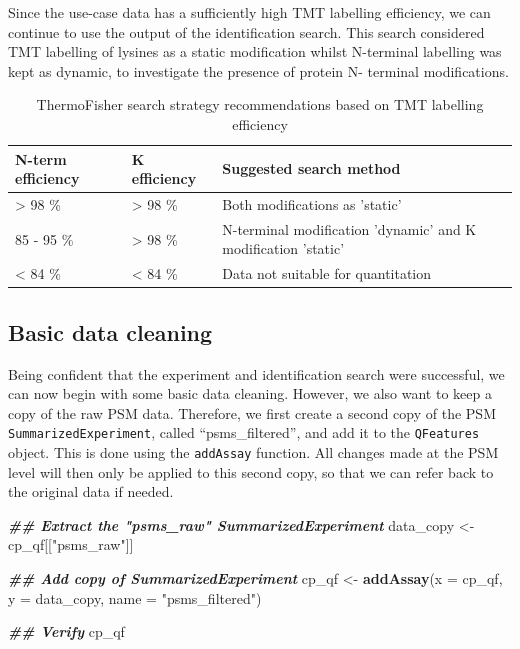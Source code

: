 \documentclass[9pt,a4paper,]{extarticle}
\newenvironment{Shaded}{\begin{snugshade}}{\end{snugshade}}
\newcommand{\AttributeTok}[1]{\textcolor[rgb]{0.13,0.29,0.53}{#1}}
\newcommand{\DocumentationTok}[1]{\textcolor[rgb]{0.56,0.35,0.01}{\textbf{\textit{#1}}}}
\newcommand{\FunctionTok}[1]{\textcolor[rgb]{0.13,0.29,0.53}{\textbf{#1}}}
\newcommand{\NormalTok}[1]{#1}
\newcommand{\OtherTok}[1]{\textcolor[rgb]{0.56,0.35,0.01}{#1}}
\newcommand{\StringTok}[1]{\textcolor[rgb]{0.31,0.60,0.02}{#1}}
\begin{document}
Since the use-case data has a sufficiently high TMT labelling efficiency, we
can continue to use the output of the identification search. This search
considered TMT labelling of lysines as a static modification whilst N-terminal
labelling was kept as dynamic, to investigate the presence of protein N-
terminal modifications.

\begin{table}

\caption{\label{tab:table2}ThermoFisher search strategy recommendations based on TMT labelling efficiency}
\centering
\begin{tabular}[t]{l|l|l}
\hline
N-term efficiency & K efficiency & Suggested search method\\
\hline
> 98 \% & > 98 \% & Both modifications as 'static'\\
\hline
85 - 95 \% & > 98 \% & N-terminal modification 'dynamic' and K modification 'static'\\
\hline
< 84 \% & < 84 \% & Data not suitable for quantitation\\
\hline
\end{tabular}
\end{table}

\subsection{Basic data cleaning}\label{basic-data-cleaning}

Being confident that the experiment and identification search were successful,
we can now begin with some basic data cleaning. However, we also want to keep a
copy of the raw PSM data. Therefore, we first create a second copy of the PSM
\texttt{SummarizedExperiment}, called ``psms\_filtered'', and add it to the \texttt{QFeatures}
object. This is done using the \texttt{addAssay} function. All changes made at the PSM
level will then only be applied to this second copy, so that we can refer back
to the original data if needed.

\begin{Shaded}
\begin{Highlighting}[]
\DocumentationTok{\#\# Extract the "psms\_raw" SummarizedExperiment}
\NormalTok{data\_copy }\OtherTok{\textless{}{-}}\NormalTok{ cp\_qf[[}\StringTok{"psms\_raw"}\NormalTok{]]}

\DocumentationTok{\#\# Add copy of SummarizedExperiment}
\NormalTok{cp\_qf }\OtherTok{\textless{}{-}} \FunctionTok{addAssay}\NormalTok{(}\AttributeTok{x =}\NormalTok{ cp\_qf, }
                  \AttributeTok{y =}\NormalTok{ data\_copy,}
                  \AttributeTok{name =} \StringTok{"psms\_filtered"}\NormalTok{)}

\DocumentationTok{\#\# Verify}
\NormalTok{cp\_qf}
\end{Highlighting}
\end{Shaded}
\end{document}
